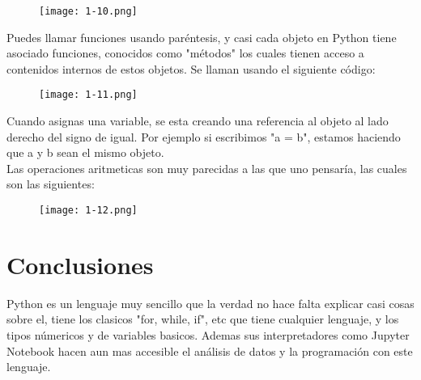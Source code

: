 \documentclass{article}
\begin{document}
\begin{figure}[h]
  \texttt{[image: 1-10.png]}
\end{figure}
\clearpage
Puedes llamar funciones usando paréntesis, y casi cada objeto en Python tiene asociado funciones, conocidos como "métodos" los cuales tienen acceso a contenidos internos de estos objetos. Se llaman usando el siguiente código:\\
\begin{figure}[h]
  \texttt{[image: 1-11.png]}
\end{figure}
Cuando asignas una variable, se esta creando una referencia al objeto al lado derecho del signo de igual. Por ejemplo si escribimos "a = b", estamos haciendo que a y b sean el mismo objeto.\\
Las operaciones aritmeticas son muy parecidas a las que uno pensaría, las cuales son las siguientes:\\
\begin{figure}[h]
  \texttt{[image: 1-12.png]}
\end{figure}
\clearpage

\section{Conclusiones}
Python es un lenguaje muy sencillo que la verdad no hace falta explicar casi cosas sobre el, tiene los clasicos "for, while, if", etc que tiene cualquier lenguaje, y los tipos númericos y de variables basicos. Ademas sus interpretadores como Jupyter Notebook hacen aun mas accesible el análisis de datos y la programación con este lenguaje.
\end{document}
